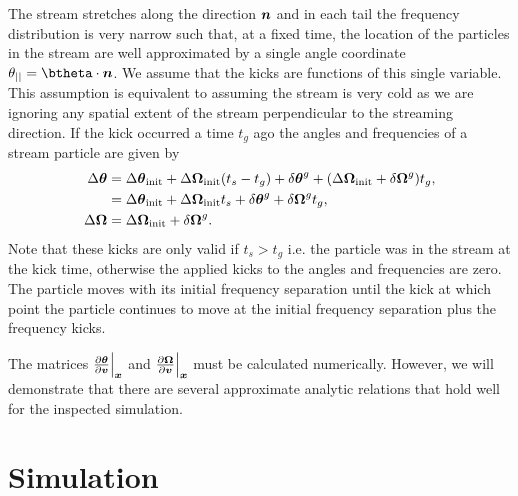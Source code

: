 \documentclass[useAMS,usenatbib,fleqn,a4paper]{mn2e}
\newcommand{\bs}[1]{\bmath{#1}}
\begin{document}
The stream stretches along the direction $\bs{n}$ and in each tail the frequency distribution is very narrow such that, at a fixed time, the location of the particles in the stream are well approximated by a single angle coordinate $\theta_{||}=\btheta\cdot\bs{n}$. We assume that the kicks are functions of this single variable. This assumption is equivalent to assuming the stream is very cold as we are ignoring any spatial extent of the stream perpendicular to the streaming direction. If the kick occurred a time $t_g$ ago the angles and frequencies of a stream particle are given by
\begin{equation}\label{linearkickevol}
\begin{split}
\Delta\bs{\theta} &= \Delta\bs{\theta}_{\rm init}+\Delta\boldsymbol{\Omega}_{\rm init}(t_s-t_g)+\delta\bs{\theta}^g+(\Delta\boldsymbol{\Omega}_{\rm init}+\delta\boldsymbol{\Omega}^g)t_g , \\&= \Delta\bs{\theta}_{\rm init}+\Delta\boldsymbol{\Omega}_{\rm init}t_s+\delta\bs{\theta}^g+\delta\boldsymbol{\Omega}^g t_g,\\
\Delta\boldsymbol{\Omega} &= \Delta\boldsymbol{\Omega}_{\rm init}+\delta\boldsymbol{\Omega}^g.
\end{split}
\end{equation}
Note that these kicks are only valid if $t_s>t_g$ i.e. the particle was in the stream at the kick time, otherwise the applied kicks to the angles and frequencies are zero.
The particle moves with its initial frequency separation until the kick at which point the particle continues to move at the initial frequency separation plus the frequency kicks.

The matrices $\frac{\upartial \bs{\theta}}{\upartial \bs{v}}\Big|_{\bs{x}}$ and $\frac{\upartial \bs{\Omega}}{\upartial \bs{v}}\Big|_{\bs{x}}$ must be calculated numerically. However, we will demonstrate that there are several approximate analytic relations that hold well for the inspected simulation.

\section{Simulation}\label{Sect::Simulation}
\end{document}
